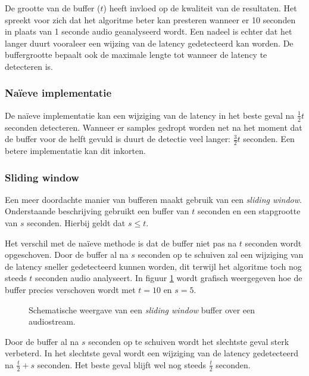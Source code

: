 De grootte van de buffer ($ t $) heeft invloed op de kwaliteit van de resultaten. Het spreekt voor zich dat het algoritme beter kan presteren wanneer er 10 seconden in plaats van 1 seconde audio geanalyseerd wordt. Een nadeel is echter dat het langer duurt vooraleer een wijzing van de latency gedetecteerd kan worden. De buffergrootte bepaalt ook de maximale lengte tot wanneer de latency te detecteren is. 

\subsubsection{Naïeve implementatie}

De naïeve implementatie kan een wijziging van de latency in het beste geval na $ \frac{1}{2} t $ seconden detecteren. Wanneer er samples gedropt worden net na het moment dat de buffer voor de helft gevuld is duurt de detectie veel langer: $ \frac{3}{2} t $ seconden. Een betere implementatie kan dit inkorten.

\subsubsection{Sliding window}

Een meer doordachte manier van bufferen maakt gebruik van een \textit{sliding window}. Onderstaande beschrijving gebruikt een buffer van $ t $ seconden en een stapgrootte van $ s $ seconden. Hierbij geldt dat $ s \leq t $. 

Het verschil met de naïeve methode is dat de buffer niet pas na $ t $ seconden wordt opgeschoven. Door de buffer al na $ s $ seconden op te schuiven zal een wijziging van de latency sneller gedetecteerd kunnen worden, dit terwijl het algoritme toch nog steeds $ t $ seconden audio analyseert. In figuur \ref{slidingwindow} wordt grafisch weergegeven hoe de buffer precies verschoven wordt met $ t = 10 $ en $ s = 5 $.

\begin{figure}[h!]
	\captionsetup{width=0.7\textwidth}
	\caption[Schematische weergave van de buffer]{Schematische weergave van een \textit{sliding window} buffer over een audiostream.}
	\begin{center}
		\advance\parskip0.3cm
		
	\end{center}
	\label{slidingwindow}
\end{figure}

Door de buffer al na $ s $ seconden op te schuiven wordt het slechtste geval sterk verbeterd. In het slechtste geval wordt een wijziging van de latency gedetecteerd na $ \frac{t}{2} + s $ seconden. Het beste geval blijft wel nog steeds $ \frac{t}{2} $ seconden.

